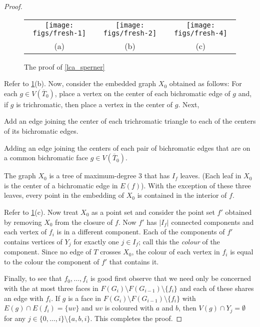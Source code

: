 \documentclass{patmorin}
\begin{document}
\begin{proof}
  \begin{figure}
    \begin{center}
      \begin{tabular}{ccc}
        \texttt{[image: figs/fresh-1]} &
        \texttt{[image: figs/fresh-2]} &
        \texttt{[image: figs/fresh-4]} \\
        (a) & (b) & (c)
      \end{tabular}
    \end{center}
    \caption{The proof of \cref{lca_sperner}}
    \label{lca_sperner_fig}
  \end{figure}

  Refer to \cref{lca_sperner_fig}(b).
  Now, consider the embedded graph $X_0$ obtained as follows: For each $g\in V(\overline{T}_0)$, place a vertex on the center of each bichromatic edge of $g$ and, if $g$ is trichromatic, then place a vertex in the center of $g$.  Next,
   \begin{compactenum}
    \item Add an edge joining the center of each trichromatic triangle to each of the centers of its bichromatic edges.
    \item Adding an edge joining the centers of each pair of bichromatic edges that are on a common bichromatic face $g\in V(\overline{T}_0)$.
  \end{compactenum}
  The graph $X_0$ is a tree of maximum-degree $3$ that has $I_f$ leaves.  (Each leaf in $X_0$ is the center of a bichromatic edge in $E(f)$).  With the exception of these three leaves, every point in the embedding of $X_0$ is contained in the interior of $f$.

  Refer to \cref{lca_sperner_fig}(c).
  Now treat $X_0$ as a point set and consider the point set $f'$ obtained by removing $X_0$ from the closure of $f$. Now $f'$ has $|I_f|$ connected components and each vertex of $f_i$ is in a different component.  Each of the components of $f'$ contains vertices of $Y_j$ for exactly one $j\in I_f$; call this the \emph{colour} of the component.  Since no edge of $T$ crosses $X_0$, the colour of each vertex in $f_i$ is equal to the colour the component of $f'$ that contains it.

  Finally, to see that $f_0,\ldots,f_i$ is good first observe that we need only be concerned with the at most three faces in $F(G_i)\setminus F(G_{i-1})\setminus\{f_i\}$ and each of these shares an edge with $f_i$.  If $g$ is a face in $F(G_i)\setminus F(G_{i-1})\setminus\{f_i\}$ with $E(g) \cap E(f_i) = \{uv\}$ and $uv$ is coloured with $a$ and $b$, then $V(g)\cap Y_j=\emptyset$ for any $j\in\{0,\ldots,i\}\setminus\{a, b, i\}$.  This completes the proof.

\end{proof}
\end{document}
